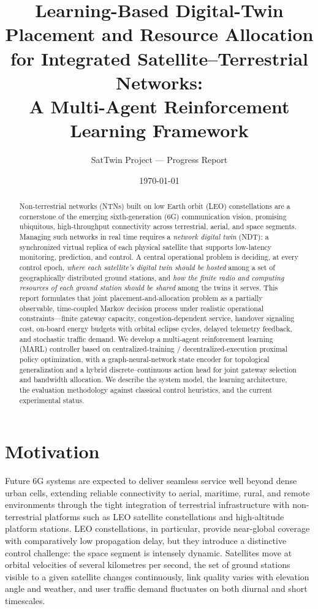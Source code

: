 \documentclass[11pt]{article}
\title{\textbf{Learning-Based Digital-Twin Placement and Resource Allocation\\
for Integrated Satellite--Terrestrial Networks:\\
A Multi-Agent Reinforcement Learning Framework}}
\author{SatTwin Project --- Progress Report}
\date{\today}
\begin{document}
\maketitle

\begin{abstract}
Non-terrestrial networks (NTNs) built on low Earth orbit (LEO) constellations are
a cornerstone of the emerging sixth-generation (6G) communication vision, promising
ubiquitous, high-throughput connectivity across terrestrial, aerial, and space
segments. Managing such networks in real time requires a \emph{network digital
twin} (NDT): a synchronized virtual replica of each physical satellite that
supports low-latency monitoring, prediction, and control. A central operational
problem is deciding, at every control epoch, \emph{where each satellite's digital
twin should be hosted} among a set of geographically distributed ground stations,
and \emph{how the finite radio and computing resources of each ground station
should be shared} among the twins it serves. This report formulates that joint
placement-and-allocation problem as a partially observable, time-coupled
Markov decision process under realistic operational constraints---finite gateway
capacity, congestion-dependent service, handover signaling cost, on-board energy
budgets with orbital eclipse cycles, delayed telemetry feedback, and stochastic
traffic demand. We develop a multi-agent reinforcement learning (MARL) controller
based on centralized-training / decentralized-execution proximal policy
optimization, with a graph-neural-network state encoder for topological
generalization and a hybrid discrete--continuous action head for joint gateway
selection and bandwidth allocation. We describe the system model, the learning
architecture, the evaluation methodology against classical control heuristics, and
the current experimental status.
\end{abstract}

\section{Motivation}
\label{sec:motivation}

Future 6G systems are expected to deliver seamless service well beyond dense urban
cells, extending reliable connectivity to aerial, maritime, rural, and remote
environments through the tight integration of terrestrial infrastructure with
non-terrestrial platforms such as LEO satellite constellations and high-altitude
platform stations. LEO constellations, in particular, provide near-global coverage
with comparatively low propagation delay, but they introduce a distinctive control
challenge: the space segment is intensely dynamic. Satellites move at orbital
velocities of several kilometres per second, the set of ground stations visible to
a given satellite changes continuously, link quality varies with elevation angle
and weather, and user traffic demand fluctuates on both diurnal and short
timescales.
\end{document}
